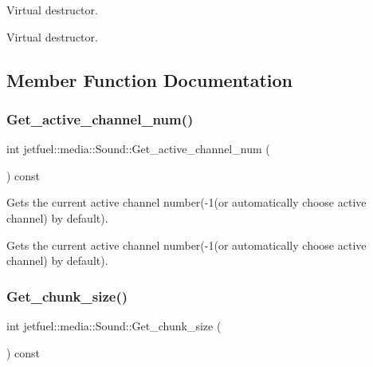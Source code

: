 Virtual destructor. 

Virtual destructor. 

\subsection{Member Function Documentation}
\mbox{\label{classjetfuel_1_1media_1_1Sound_afcef9fca1204403d6f3d52fc4b494463}} 
\subsubsection{\texorpdfstring{Get\+\_\+active\+\_\+channel\+\_\+num()}{Get\_active\_channel\_num()}}
{\footnotesize\ttfamily int jetfuel\+::media\+::\+Sound\+::\+Get\+\_\+active\+\_\+channel\+\_\+num (\begin{DoxyParamCaption}{ }\end{DoxyParamCaption}) const\hspace{0.3cm}{\ttfamily [inline]}}



Gets the current active channel number(-\/1(or automatically choose active channel) by default). 

Gets the current active channel number(-\/1(or automatically choose active channel) by default). \mbox{\label{classjetfuel_1_1media_1_1Sound_a8f1cbbaaf31a106938968f256e77bad7}} 
\subsubsection{\texorpdfstring{Get\+\_\+chunk\+\_\+size()}{Get\_chunk\_size()}}
{\footnotesize\ttfamily int jetfuel\+::media\+::\+Sound\+::\+Get\+\_\+chunk\+\_\+size (\begin{DoxyParamCaption}{ }\end{DoxyParamCaption}) const\hspace{0.3cm}{\ttfamily [inline]}}



